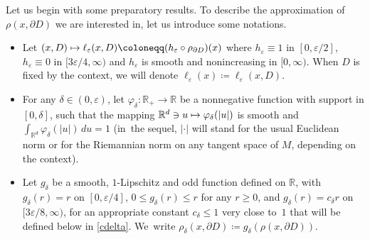 \documentclass[10pt]{amsart}
\newcommand\mto{\mathchoice{\longmapsto}{\mapsto}{\mapsto}{\mapsto}}
\theoremstyle{plain}
\theoremstyle{definition}
\newcommand{\RR}{{\mathbb R}}
\newcommand\df{\coloneqq}
\let\d\delta
\let\e\varepsilon
\begin{document}
Let us begin with some preparatory results.
To describe the approximation of $\rho(x,\partial D)$ we are interested in, let us introduce some notations.
\begin{itemize}
\item
Let $(x,D)\mto \ell_\e(x,D)\df(h_\e\circ \rho_{\partial D})(x)$ where $h_\e\equiv 1$ in $[0,\e/2]$, $h_\e\equiv 0$ in $[3\e/4,\infty)$ and $h_\e$ is smooth and nonincreasing in $[0,\infty)$. When $D$ is fixed by the context, we will denote $\ell_\e(x)\df\ell_\e(x,D)$.
\item
For any $\d\in (0,\e)$, let $\varphi_\d:\RR_+\to \RR$ be a nonnegative function with support in $[0,\delta]$, such that
the mapping $\RR^d\ni u\mto \varphi_\d(\vert u\vert)$ is smooth and $\int_{\RR^d} \varphi_\d(\vert u\vert)\, du=1$ (in~the sequel, $\vert \cdot\vert$ will stand for the usual Euclidean norm or for the Riemannian norm on any tangent space of $M$, depending on the context).
\item
Let $g_\d$ be a smooth, $1$-Lipschitz and odd function defined on $\RR$, with $g_\d(r)=r$ on $[0,\e/4]$, $0\leq g_\d(r)\leq r$ for any $r\geq 0$, and $g_\d(r)=c_\delta r$ on $[3\e/8,\infty)$, for an appropriate constant $c_\delta\leq 1$ very close to~$1$ that will be defined below in \eqref{cdelta}. We~write $\rho_\d(x,\partial D)\df g_\d(\rho(x,\partial D))$.
\end{itemize}
\end{document}
